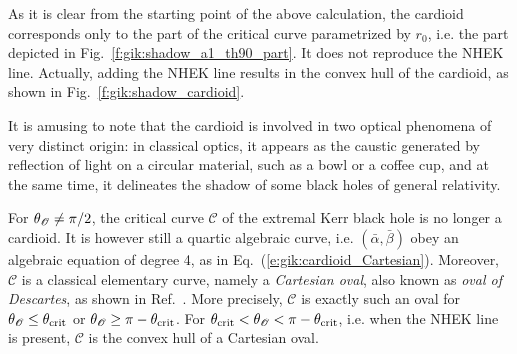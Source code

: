 As it is clear from the starting point of the above calculation, the cardioid corresponds only to the part of the critical curve parametrized by $r_0$, i.e. the part depicted in
Fig.~\ref{f:gik:shadow_a1_th90_part}. It does not reproduce the NHEK line. Actually, adding
the NHEK line results in the convex hull of the cardioid, as shown in Fig.~\ref{f:gik:shadow_cardioid}.

\begin{remark}
It is amusing to note that the cardioid is involved in two optical phenomena of
very distinct origin: in classical optics, it appears as
the caustic generated by reflection of light on a circular material, such as a bowl or
a coffee cup, and at the same time, it delineates the shadow of
some black holes of general relativity.
\end{remark}

\begin{remark}
For $\theta_{\mathscr{O}}\neq \pi/2$, the critical curve $\mathscr{C}$ of the extremal Kerr black hole
is no longer a cardioid. It is however still a quartic algebraic curve,
i.e. $(\bar{\alpha},\bar{\beta})$ obey an algebraic equation of degree 4,
as in Eq.~(\ref{e:gik:cardioid_Cartesian}). Moreover, $\mathscr{C}$ is a classical elementary curve,
namely a \emph{Cartesian oval}, also
known as \emph{oval of Descartes},
as shown in Ref.~\cite{GrallL20c}. More precisely, $\mathscr{C}$ is exactly such an oval
for $\theta_{\mathscr{O}} \leq  \theta_{\rm crit}$ or $\theta_{\mathscr{O}} \geq \pi - \theta_{\rm crit}$.
For $\theta_{\rm crit}  < \theta_{\mathscr{O}} < \pi - \theta_{\rm crit}$, i.e. when the NHEK line is present,
$\mathscr{C}$ is the convex hull of a Cartesian oval.
\end{remark}

